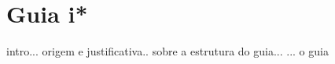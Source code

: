 \chapter{Guia i*}
\label{anexo:guia}
intro...
origem e justificativa..
sobre a estrutura do guia...
...
o guia 